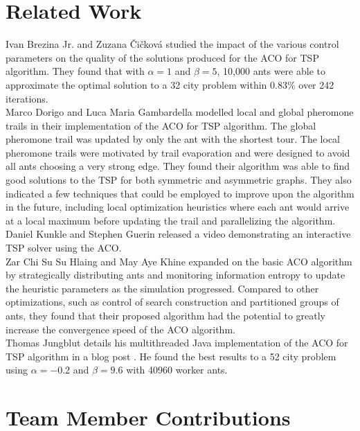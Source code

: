 \documentclass[twocolumn]{article}
\begin{document}
\section{Related Work}

Ivan Brezina Jr. and Zuzana \v{C}i\v{c}kov\'{a} \cite{mis:aco} studied the 
impact of the various control parameters on the quality of the solutions 
produced for the ACO for TSP algorithm. They found that with $\alpha=1$ and 
$\beta=5$, 10,000 ants were able to approximate the optimal solution to a 32 city
problem within 0.83\% over 242 iterations. \\

Marco Dorigo and Luca Maria Gambardella \cite{iridia:aco} modelled local and 
global pheromone trails in their implementation of the ACO for TSP algorithm. 
The global pheromone trail was updated by only the ant with the shortest tour. 
The local pheromone trails were motivated by trail evaporation and were designed
to avoid all ants choosing a very strong edge. They found their algorithm was 
able to find good solutions to the TSP for both symmetric and asymmetric graphs.
They also indicated a few techniques that could be employed to improve upon the 
algorithm in the future, including local optimization heuristics where each ant 
would arrive at a local maximum before updating the trail and parallelizing the
algorithm. \\

Daniel Kunkle and Stephen Guerin released a video \cite{youtube:aco}
demonstrating an interactive TSP solver using the ACO. \\

Zar Chi Su Su Hlaing and May Aye Khine \cite{ipcsit:aco} expanded on the basic 
ACO algorithm by strategically distributing ants and monitoring information 
entropy to update the heuristic parameters as the simulation progressed. 
Compared to other optimizations, such as control of search construction and 
partitioned groups of ants, they found that their proposed algorithm had the 
potential to greatly increase the convergence speed of the ACO algorithm. \\

Thomas Jungblut details his multithreaded Java implementation of the ACO for TSP
algorithm in a blog post \cite{jungblut:aco}. He found the best results to a 52
city problem using $\alpha=-0.2$ and $\beta=9.6$ with 40960 worker ants.

\section{Team Member Contributions}
\end{document}
